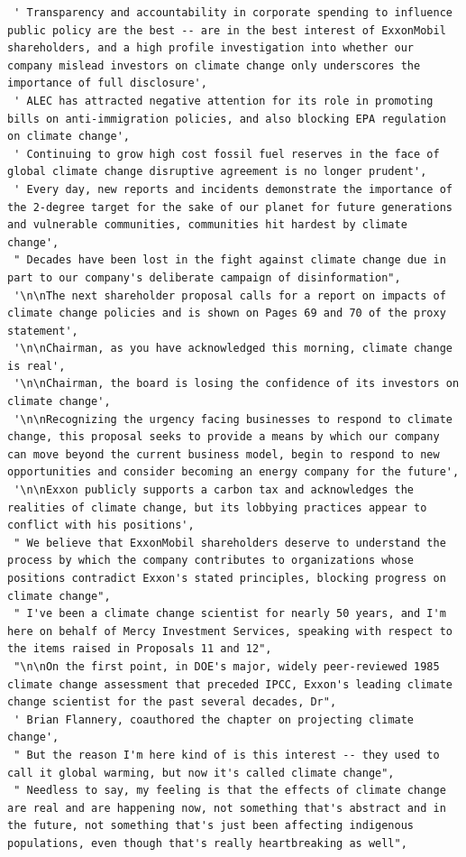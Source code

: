 \documentclass[
  letterpaper,
  DIV=11,
  numbers=noendperiod]{scrreprt}
\begin{document}
\begin{verbatim}
 ' Transparency and accountability in corporate spending to influence public policy are the best -- are in the best interest of ExxonMobil shareholders, and a high profile investigation into whether our company mislead investors on climate change only underscores the importance of full disclosure',
 ' ALEC has attracted negative attention for its role in promoting bills on anti-immigration policies, and also blocking EPA regulation on climate change',
 ' Continuing to grow high cost fossil fuel reserves in the face of global climate change disruptive agreement is no longer prudent',
 ' Every day, new reports and incidents demonstrate the importance of the 2-degree target for the sake of our planet for future generations and vulnerable communities, communities hit hardest by climate change',
 " Decades have been lost in the fight against climate change due in part to our company's deliberate campaign of disinformation",
 '\n\nThe next shareholder proposal calls for a report on impacts of climate change policies and is shown on Pages 69 and 70 of the proxy statement',
 '\n\nChairman, as you have acknowledged this morning, climate change is real',
 '\n\nChairman, the board is losing the confidence of its investors on climate change',
 '\n\nRecognizing the urgency facing businesses to respond to climate change, this proposal seeks to provide a means by which our company can move beyond the current business model, begin to respond to new opportunities and consider becoming an energy company for the future',
 '\n\nExxon publicly supports a carbon tax and acknowledges the realities of climate change, but its lobbying practices appear to conflict with his positions',
 " We believe that ExxonMobil shareholders deserve to understand the process by which the company contributes to organizations whose positions contradict Exxon's stated principles, blocking progress on climate change",
 " I've been a climate change scientist for nearly 50 years, and I'm here on behalf of Mercy Investment Services, speaking with respect to the items raised in Proposals 11 and 12",
 "\n\nOn the first point, in DOE's major, widely peer-reviewed 1985 climate change assessment that preceded IPCC, Exxon's leading climate change scientist for the past several decades, Dr",
 ' Brian Flannery, coauthored the chapter on projecting climate change',
 " But the reason I'm here kind of is this interest -- they used to call it global warming, but now it's called climate change",
 " Needless to say, my feeling is that the effects of climate change are real and are happening now, not something that's abstract and in the future, not something that's just been affecting indigenous populations, even though that's really heartbreaking as well",

\end{verbatim}
\end{document}
